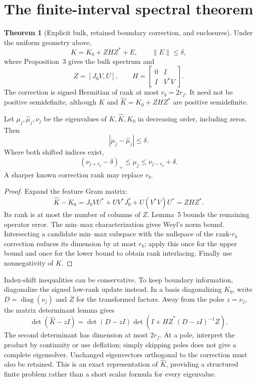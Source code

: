 \documentclass[11pt]{article}
\DeclareMathOperator{\diag}{diag}
\theoremstyle{definition}
\newtheorem{theorem}[lemma]{Theorem}
\begin{document}
\section{The finite-interval spectral theorem}
\begin{theorem}[Explicit bulk, retained boundary correction, and enclosures]
Under the uniform geometry above,
\[
K=K_0+ZHZ^*+E,\qquad\|E\|\le\delta,
\]
where Proposition~3 gives the bulk spectrum and
\[
Z=[J_0V,U],\qquad
H=\begin{bmatrix}0&I\\I&V^*V\end{bmatrix}.
\]
The correction is signed Hermitian of rank at most $r_b=2r_f$.
It need not be positive semidefinite, although $K$ and
$\widehat K=K_0+ZHZ^*$ are positive semidefinite.

Let $\mu_j,\widehat\mu_j,\nu_j$ be the eigenvalues of $K,\widehat K,K_0$
in decreasing order, including zeros. Then
\[
|\mu_j-\widehat\mu_j|\le\delta.
\]
Where both shifted indices exist,
\[
(\nu_{j+r_b}-\delta)_+\le\mu_j
\le\nu_{j-r_b}+\delta.
\]
A sharper known correction rank may replace $r_b$.
\end{theorem}
\begin{proof}
Expand the feature Gram matrix:
\[
\widehat K-K_0
=J_0VU^*+UV^*J_0^*+U(V^*V)U^*=ZHZ^*.
\]
Its rank is at most the number of columns of $Z$. Lemma~5 bounds the
remaining operator error. The min--max characterization gives Weyl's norm
bound. Intersecting a candidate min--max subspace with the nullspace of the
rank-$r_b$ correction reduces its dimension by at most $r_b$; apply this
once for the upper bound and once for the lower bound to obtain rank
interlacing. Finally use nonnegativity of $K$.
\end{proof}
Index-shift inequalities can be conservative. To keep boundary information,
diagonalize the signed low-rank update instead. In a basis diagonalizing
$K_0$, write $D=\diag(\nu_j)$ and $\overline Z$ for the transformed factors.
Away from the poles $z=\nu_j$, the matrix determinant lemma gives
\[
\det(\widehat K-zI)=\det(D-zI)
\det\!\left(I+H\overline Z^*(D-zI)^{-1}\overline Z\right).
\]
The second determinant has dimension at most $2r_f$. At a pole, interpret
the product by continuity or use deflation; simply skipping poles does not
give a complete eigensolver. Unchanged eigenvectors orthogonal to the
correction must also be retained. This is an exact representation of
$\widehat K$, providing a structured finite problem rather than a short
scalar formula for every eigenvalue.
\end{document}
